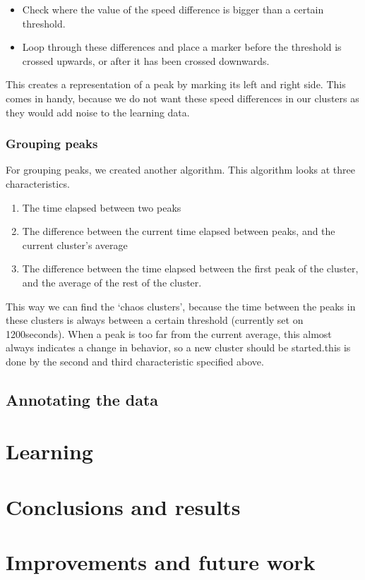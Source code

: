 \documentclass[a4paper,10pt]{article}
\newcommand{\timeThreshold}{1200}
\begin{document}
 \begin{itemize}
    \item Check where the value of the speed difference is bigger than a certain
    threshold.
    \item Loop through these differences and place a marker before the threshold
    is crossed upwards, or after it has been crossed downwards. 
 \end{itemize}
 
 This creates a representation of a peak by marking its left and right side.
 This comes in handy, because we do not want these speed differences in our
 clusters as they would add noise to the learning data.

 \subsubsection{Grouping peaks}
 For grouping peaks, we created another algorithm. This algorithm looks at three
 characteristics.  
 \begin{enumerate}
 \item The time elapsed between two peaks
 \item The difference between the current time elapsed between peaks, and the
 current cluster's average
 \item The difference between the time elapsed between the first peak of the
 cluster, and the average of the rest of the cluster.
 \end{enumerate}
 This way we can find the `chaos clusters', because the time between the peaks
 in these clusters is always between a certain threshold (currently set on
 \timeThreshold seconds). 
 When a peak is too far from the  current average, this almost always indicates
 a change in behavior, so a new cluster should be started.this is done by the
 second and third characteristic specified above.


 \subsection{Annotating the data}


\section{Learning}

\section{Conclusions and results}

\section{Improvements and future work}
\end{document}
